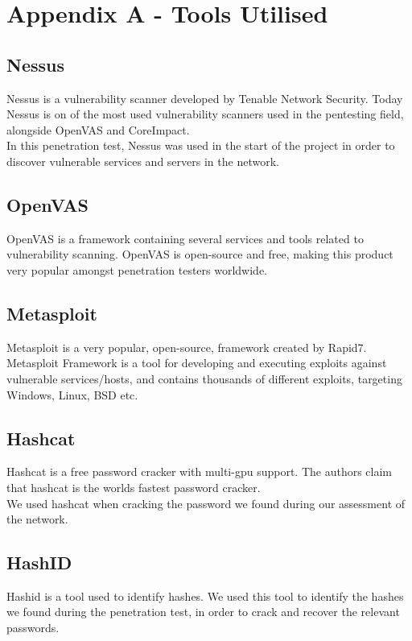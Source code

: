 \section{Appendix A - Tools Utilised}

    \subsection*{Nessus}
    Nessus is a vulnerability scanner developed by Tenable Network Security. Today Nessus is on of the most used vulnerability scanners used in the pentesting field, alongside OpenVAS and CoreImpact.\\
    In this penetration test, Nessus was used in the start of the project in order to discover vulnerable services and servers in the network.
     
    \subsection*{OpenVAS}
    OpenVAS is a framework containing several services and tools related to vulnerability scanning. OpenVAS is open-source and free, making this product very popular amongst penetration testers worldwide.
     
    \subsection*{Metasploit}
    Metasploit is a very popular, open-source, framework created by Rapid7. Metasploit Framework is a tool for developing and executing exploits against vulnerable services/hosts, and contains thousands of different exploits, targeting Windows, Linux, BSD etc.
     
    \subsection*{Hashcat}
    Hashcat is a free password cracker with multi-gpu support. The authors claim that hashcat is the worlds fastest password cracker.\\
    We used hashcat when cracking the password we found during our assessment of the network.
     
    \subsection*{HashID}
    Hashid is a tool used to identify hashes. We used this tool to identify the hashes we found during the penetration test, in order to crack and recover the relevant passwords.
     
